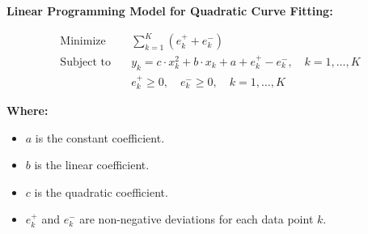 \documentclass{article}
\begin{document}
\textbf{Linear Programming Model for Quadratic Curve Fitting:}

\begin{align*}
\text{Minimize} \quad & \sum_{k=1}^{K} (e_k^+ + e_k^-) \\
\text{Subject to} \quad & y_k = c \cdot x_k^2 + b \cdot x_k + a + e_k^+ - e_k^-, \quad k = 1, \ldots, K \\
& e_k^+ \geq 0, \quad e_k^- \geq 0, \quad k = 1, \ldots, K
\end{align*}

\textbf{Where:}

\begin{itemize}
    \item \( a \) is the constant coefficient.
    \item \( b \) is the linear coefficient.
    \item \( c \) is the quadratic coefficient.
    \item \( e_k^+ \) and \( e_k^- \) are non-negative deviations for each data point \( k \).
\end{itemize}
\end{document}
